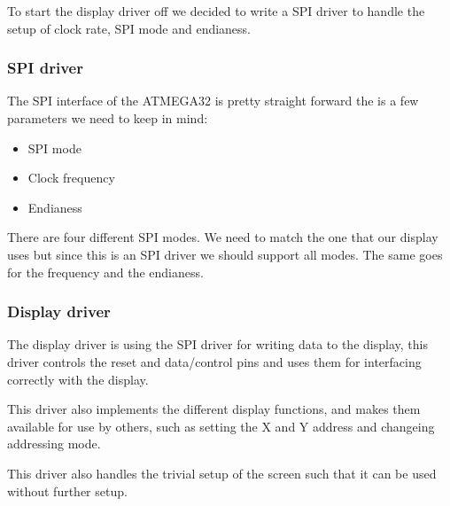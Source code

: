 To start the display driver off we decided to write a SPI driver to handle the setup of clock rate, SPI mode and endianess.

\subsubsection{SPI driver}
The SPI interface of the ATMEGA32 is pretty straight forward the is a few parameters we need to keep in mind:

\begin{itemize}
\item SPI mode
\item Clock frequency
\item Endianess
\end{itemize}

There are four different SPI modes. We need to match the one that our display uses but since this is an SPI driver we should support all modes.
The same goes for the frequency and the endianess. 

\subsubsection{Display driver}
The display driver is using the SPI driver for writing data to the display, this driver controls the reset and data/control pins and uses them for interfacing
correctly with the display. 

This driver also implements the different display functions, and makes them available for use by others, 
such as setting the X and Y address and changeing addressing mode. 

This driver also handles the trivial setup of the screen such that it can be used without further setup.